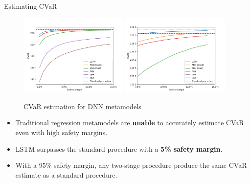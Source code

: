 \documentclass[9pt,handout]{beamer}
\begin{document}
\begin{frame}{Estimating CVaR}
    
    \begin{figure}[H]
        \includegraphics[width=0.48\textwidth]{../project2/figures/CVaR/allLN.png}
        \includegraphics[width=0.48\textwidth]{../project2/figures/CVaR/zoomedLN.png}
        \caption{CVaR estimation for DNN metamodels}
    \end{figure}

    \begin{itemize}
        \item Traditional regression metamodels are \textbf{unable} to accurately estimate CVaR even with high safety margins.
        \item LSTM surpasses the standard procedure with a \textbf{5\% safety margin}.
        \item With a 95\% safety margin, any two-stage procedure produce the same CVaR estimate as a standard procedure.
    \end{itemize}

\end{frame}
\end{document}
